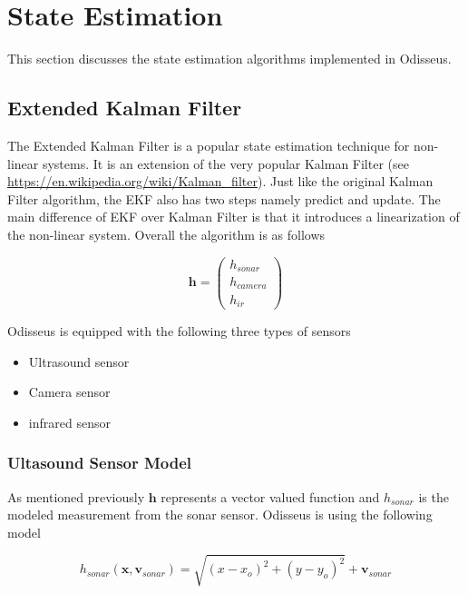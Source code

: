\section{State Estimation}
\label{state_estimation}

This section discusses the state estimation algorithms 
implemented in Odisseus. 

\subsection{Extended Kalman Filter}
\label{extended_kalman_filter}
The Extended Kalman Filter is a popular state estimation technique for non-linear systems. 
It is an extension of the very popular Kalman Filter (see \url{https://en.wikipedia.org/wiki/Kalman_filter}).
Just like the original Kalman Filter algorithm, the EKF also has two steps namely predict and update. 
The main difference of EKF over Kalman Filter is that it introduces a linearization of the non-linear system. Overall the algorithm is as follows

\begin{equation}
\mathbf{h} = \begin{pmatrix}
h_{sonar} \\
h_{camera} \\
h_{ir}
\end{pmatrix}
\end{equation}


Odisseus is equipped with the following three types of sensors

\begin{itemize}
	\item Ultrasound sensor
	\item Camera sensor
	\item infrared sensor
\end{itemize}

\subsubsection{Ultasound Sensor Model}

As mentioned previously $\mathbf{h}$ represents a vector valued function and $h_{sonar}$ is the modeled measurement from the
sonar sensor. Odisseus is using the following model

\begin{equation}
h_{sonar}(\mathbf{x}, \mathbf{v}_{sonar}) = \sqrt{(x - x_o)^2 + (y - y_o)^2} +  \mathbf{v}_{sonar}
\label{sonar_h}
\end{equation} 

